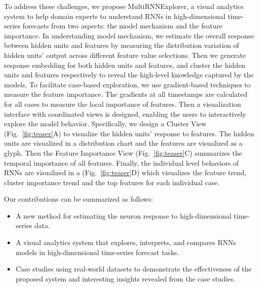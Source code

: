 To address these challenges, we propose MultiRNNExplorer, a visual analytics system to help domain experts to understand RNNs in high-dimensional time-series forecasts from two aspects: the model mechanism and the feature importance. In understanding model mechanism, we estimate the overall response between hidden units and features by measuring the distribution variation of hidden units' output across different feature value selections. Then we generate response embedding for both hidden units and features, and cluster the hidden units and features respectively to reveal the high-level knowledge captured by the models. 
To facilitate case-based exploration, we use gradient-based techniques to measure the feature importance.  The gradients at all timestamps are calculated for all cases to measure the local importance of features. 
Then a visualization interface with coordinated views is designed, enabling the users to interactively explore the model behavior. 
Specifically, we design a Cluster View (Fig.~\ref{fig:teaser}A) to visualize the hidden units' response to features. 
The hidden units are visualized in a distribution chart and the features are visualized as a glyph. Then the Feature Importance View (Fig.~\ref{fig:teaser}C) summarizes the temporal importance of all features. Finally, the individual level behaviors of RNNs are visualized in a  (Fig.~\ref{fig:teaser}D) which visualizes the feature trend, cluster importance trend and the top features for each individual case.

Our contributions can be summarized as follows:
\begin{itemize}
  \item A new method for estimating the neuron response to high-dimensional time-series data. 
  \item A visual analytics system that explores, interprets, and compares RNNs models in high-dimensional time-series forecast tasks. 
  \item Case studies using real-world datasets to demonstrate the effectiveness of the proposed system and interesting insights revealed from the case studies.
\end{itemize}





